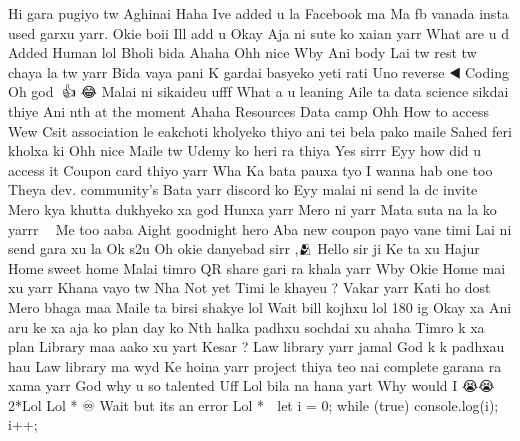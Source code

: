 Hi gara pugiyo tw Aghinai Haha Ive added u la Facebook ma Ma fb vanada insta used garxu yarr. Okie boii Ill add u Okay Aja ni sute ko xaian yarr What are u d Added Human lol Bholi bida Ahaha Ohh nice Wby Ani body Lai tw rest tw chaya la tw yarr Bida vaya pani K gardai basyeko yeti rati Uno reverse ◀️ Coding Oh god 🥹👍 😂 Malai ni sikaideu ufff What a u leaning Aile ta data science sikdai thiye Ani nth at the moment Ahaha Resources Data camp Ohh How to access Wew Csit association le eakchoti kholyeko thiyo ani tei bela pako maile Sahed feri kholxa ki Ohh nice Maile tw Udemy ko heri ra thiya Yes sirrr Eyy how did u access it Coupon card thiyo yarr Wha Ka bata pauxa tyo I wanna hab one too Theya dev. community's Bata yarr discord ko Eyy malai ni send la dc invite Mero kya khutta dukhyeko xa god Hunxa yarr Mero ni yarr Mata suta na la ko yarrr 🥹🥹 Me too aaba Aight goodnight hero Aba new coupon payo vane timi Lai ni send gara xu la Ok s2u Oh okie danyebad sirr ,🫂 Hello sir ji Ke ta xu Hajur Home sweet home Malai timro QR share gari ra khala yarr Wby Okie Home mai xu yarr Khana vayo tw Nha Not yet Timi le khayeu ? Vakar yarr Kati ho dost Mero bhaga maa Maile ta birsi shakye lol Wait bill kojhxu lol 180 ig Okay xa Ani aru ke xa aja ko plan day ko Nth halka padhxu sochdai xu ahaha Timro k xa plan Library maa aako xu yart Kesar ? Law library yarr jamal God k k padhxau hau Law library ma wyd Ke hoina yarr project thiya teo nai complete garana ra xama yarr God why u so talented Uff Lol bila na hana yart Why would I 😭😭 2*Lol Lol * ♾️ Wait but its an error Lol * 💯 let i = 0;
while (true) {
console.log(i);
i++;
}
